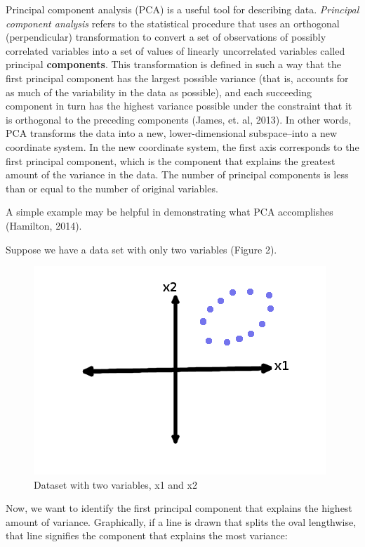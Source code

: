\documentclass[12pt,twoside]{reedthesis}
\begin{document}
  Principal component analysis (PCA) is a useful tool for describing data.
  \emph{Principal component analysis} refers to the statistical procedure
  that uses an orthogonal (perpendicular) transformation to convert a set
  of observations of possibly correlated variables into a set of values of
  linearly uncorrelated variables called principal \textbf{components}.
  This transformation is defined in such a way that the first principal
  component has the largest possible variance (that is, accounts for as
  much of the variability in the data as possible), and each succeeding
  component in turn has the highest variance possible under the constraint
  that it is orthogonal to the preceding components (James, et. al, 2013).
  In other words, PCA transforms the data into a new, lower-dimensional
  subspace--into a new coordinate system. In the new coordinate system,
  the first axis corresponds to the first principal component, which is
  the component that explains the greatest amount of the variance in the
  data. The number of principal components is less than or equal to the
  number of original variables.
  
  A simple example may be helpful in demonstrating what PCA accomplishes
  (Hamilton, 2014).
  
  Suppose we have a data set with only two variables (Figure 2).
  
  \begin{figure}[htbp]
  \centering
  \includegraphics{figure/OriginalDataset.png}
  \caption{Dataset with two variables, x1 and x2}
  \end{figure}
  
  Now, we want to identify the first principal component that explains the
  highest amount of variance. Graphically, if a line is drawn that splits
  the oval lengthwise, that line signifies the component that explains the
  most variance:
  
\end{document}
